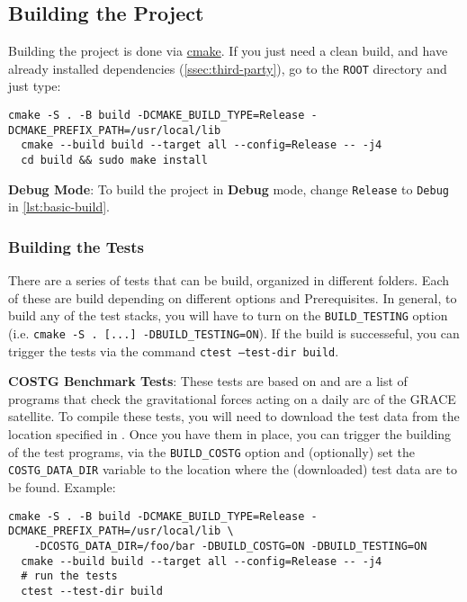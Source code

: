 \subsection{Building the Project}
Building the project is done via \href{https://cmake.org/}{cmake}. If you just need a clean build, and have already 
installed dependencies (\ref{ssec:third-party}), go to the \texttt{ROOT} directory and just type:
\begin{lstlisting}[style=shell, label={lst:basic-build}]
  cmake -S . -B build -DCMAKE_BUILD_TYPE=Release -DCMAKE_PREFIX_PATH=/usr/local/lib
  cmake --build build --target all --config=Release -- -j4
  cd build && sudo make install
\end{lstlisting}

\noindent\textbf{Debug Mode}: To build the project in \textbf{Debug} mode, change \texttt{Release} to \texttt{Debug} 
in \ref{lst:basic-build}.

\subsubsection{Building the Tests}
There are a series of tests that can be build, organized in different folders. Each of these are build depending on 
different options and Prerequisites. In general, to build any of the test stacks, you will have to turn on the 
\texttt{BUILD\_TESTING} option (i.e. \texttt{cmake -S . [...] -DBUILD\_TESTING=ON}). If the build is successeful, you 
can trigger the tests via the command \texttt{ctest --test-dir build}.

\noindent\textbf{COSTG Benchmark Tests}: These tests are based on \cite{Lasser2020} and are a list of programs 
that check the gravitational forces acting on a daily arc of the GRACE satellite. To compile these tests, you will need 
to download the test data from the location specified in \cite{Lasser2020}. Once you have them in place, you can trigger 
the building of the test programs, via the \texttt{BUILD\_COSTG} option and (optionally) set the \texttt{COSTG\_DATA\_DIR} 
variable to the location where the (downloaded) test data are to be found. Example:
\begin{lstlisting}[style=shell, label={lst:basic-build}]
  cmake -S . -B build -DCMAKE_BUILD_TYPE=Release -DCMAKE_PREFIX_PATH=/usr/local/lib \
    -DCOSTG_DATA_DIR=/foo/bar -DBUILD_COSTG=ON -DBUILD_TESTING=ON
  cmake --build build --target all --config=Release -- -j4 
  # run the tests
  ctest --test-dir build
\end{lstlisting}


